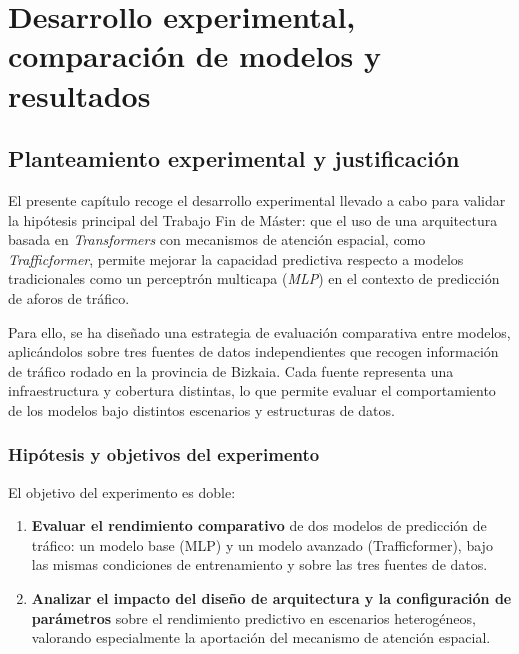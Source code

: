 \section{Desarrollo experimental, comparación de modelos y resultados}
\label{sec:desarrollo_comp_results}

%
%

\subsection{Planteamiento experimental y justificación}
\label{sec:planteamiento_experimental}

El presente capítulo recoge el desarrollo experimental llevado a cabo para validar la hipótesis principal del Trabajo Fin de Máster: que el uso de una arquitectura basada en \textit{Transformers} con mecanismos de atención espacial, como \textit{Trafficformer}, permite mejorar la capacidad predictiva respecto a modelos tradicionales como un perceptrón multicapa (\textit{MLP}) en el contexto de predicción de aforos de tráfico.

Para ello, se ha diseñado una estrategia de evaluación comparativa entre modelos, aplicándolos sobre tres fuentes de datos independientes que recogen información de tráfico rodado en la provincia de Bizkaia. Cada fuente representa una infraestructura y cobertura distintas, lo que permite evaluar el comportamiento de los modelos bajo distintos escenarios y estructuras de datos.

\subsubsection*{Hipótesis y objetivos del experimento}

El objetivo del experimento es doble:

\begin{enumerate}
	\item \textbf{Evaluar el rendimiento comparativo} de dos modelos de predicción de tráfico: un modelo base (MLP) y un modelo avanzado (Trafficformer), bajo las mismas condiciones de entrenamiento y sobre las tres fuentes de datos.
	\item \textbf{Analizar el impacto del diseño de arquitectura y la configuración de parámetros} sobre el rendimiento predictivo en escenarios heterogéneos, valorando especialmente la aportación del mecanismo de atención espacial.
\end{enumerate}

